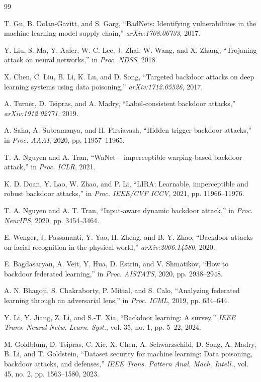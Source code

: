 \begin{thebibliography}{99}

T. Gu, B. Dolan-Gavitt, and S. Garg, ``BadNets: Identifying vulnerabilities in the machine learning model supply chain,'' \emph{arXiv:1708.06733}, 2017.

Y. Liu, S. Ma, Y. Aafer, W.-C. Lee, J. Zhai, W. Wang, and X. Zhang, ``Trojaning attack on neural networks,'' in \emph{Proc. NDSS}, 2018.

X. Chen, C. Liu, B. Li, K. Lu, and D. Song, ``Targeted backdoor attacks on deep learning systems using data poisoning,'' \emph{arXiv:1712.05526}, 2017.

A. Turner, D. Tsipras, and A. Madry, ``Label-consistent backdoor attacks,'' \emph{arXiv:1912.02771}, 2019.

A. Saha, A. Subramanya, and H. Pirsiavash, ``Hidden trigger backdoor attacks,'' in \emph{Proc. AAAI}, 2020, pp. 11957--11965.

T. A. Nguyen and A. Tran, ``WaNet -- imperceptible warping-based backdoor attack,'' in \emph{Proc. ICLR}, 2021.

K. D. Doan, Y. Lao, W. Zhao, and P. Li, ``LIRA: Learnable, imperceptible and robust backdoor attacks,'' in \emph{Proc. IEEE/CVF ICCV}, 2021, pp. 11966--11976.

T. A. Nguyen and A. T. Tran, ``Input-aware dynamic backdoor attack,'' in \emph{Proc. NeurIPS}, 2020, pp. 3454--3464.

E. Wenger, J. Passananti, Y. Yao, H. Zheng, and B. Y. Zhao, ``Backdoor attacks on facial recognition in the physical world,'' \emph{arXiv:2006.14580}, 2020.

E. Bagdasaryan, A. Veit, Y. Hua, D. Estrin, and V. Shmatikov, ``How to backdoor federated learning,'' in \emph{Proc. AISTATS}, 2020, pp. 2938--2948.

A. N. Bhagoji, S. Chakraborty, P. Mittal, and S. Calo, ``Analyzing federated learning through an adversarial lens,'' in \emph{Proc. ICML}, 2019, pp. 634--644.

Y. Li, Y. Jiang, Z. Li, and S.-T. Xia, ``Backdoor learning: A survey,'' \emph{IEEE Trans. Neural Netw. Learn. Syst.}, vol. 35, no. 1, pp. 5--22, 2024.

M. Goldblum, D. Tsipras, C. Xie, X. Chen, A. Schwarzschild, D. Song, A. Madry, B. Li, and T. Goldstein, ``Dataset security for machine learning: Data poisoning, backdoor attacks, and defenses,'' \emph{IEEE Trans. Pattern Anal. Mach. Intell.}, vol. 45, no. 2, pp. 1563--1580, 2023.


\end{thebibliography}
